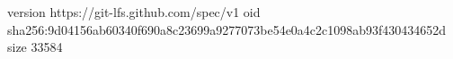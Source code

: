 version https://git-lfs.github.com/spec/v1
oid sha256:9d04156ab60340f690a8c23699a9277073be54e0a4c2c1098ab93f430434652d
size 33584
